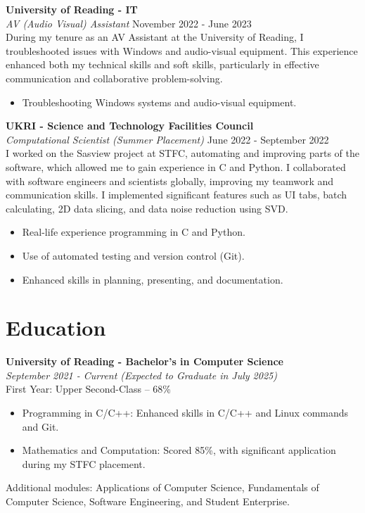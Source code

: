 \documentclass[a4paper,12pt]{article}
\begin{document}
\vspace{0.3cm}

\textbf{University of Reading - IT} \\
\textit{AV (Audio Visual) Assistant} \hfill November 2022 - June 2023 \\
During my tenure as an AV Assistant at the University of Reading, I troubleshooted issues with Windows and audio-visual equipment. This experience enhanced both my technical skills and soft skills, particularly in effective communication and collaborative problem-solving.

\begin{itemize}[left=0pt,labelsep=5pt]
    \item Troubleshooting Windows systems and audio-visual equipment.
\end{itemize}

\vspace{0.3cm}

\textbf{UKRI - Science and Technology Facilities Council} \\
\textit{Computational Scientist (Summer Placement)} \hfill June 2022 - September 2022 \\
I worked on the Sasview project at STFC, automating and improving parts of the software, which allowed me to gain experience in C and Python. I collaborated with software engineers and scientists globally, improving my teamwork and communication skills. I implemented significant features such as UI tabs, batch calculating, 2D data slicing, and data noise reduction using SVD.

\begin{itemize}[left=0pt,labelsep=5pt]
    \item Real-life experience programming in C and Python.
    \item Use of automated testing and version control (Git).
    \item Enhanced skills in planning, presenting, and documentation.
\end{itemize}

\vspace{0.5cm}

\section*{Education}

\textbf{University of Reading - Bachelor’s in Computer Science} \\
\textit{September 2021 - Current (Expected to Graduate in July 2025)} \\
First Year: Upper Second-Class – 68\% \\
\begin{itemize}[left=0pt,labelsep=5pt]
    \item Programming in C/C++: Enhanced skills in C/C++ and Linux commands and Git.
    \item Mathematics and Computation: Scored 85\%, with significant application during my STFC placement.
\end{itemize}
Additional modules: Applications of Computer Science, Fundamentals of Computer Science, Software Engineering, and Student Enterprise. \\
\end{document}
